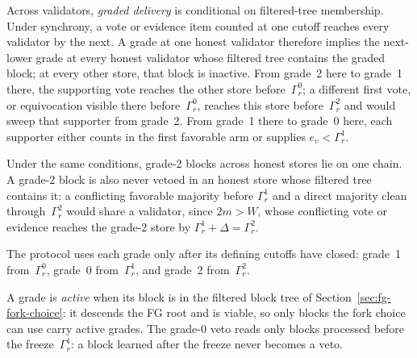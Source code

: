\documentclass{article}
\theoremstyle{plain}
\theoremstyle{definition}
\theoremstyle{remark}
\begin{document}
Across validators, \emph{graded delivery} is conditional on
filtered-tree membership.
Under synchrony, a vote or evidence item counted at one cutoff reaches
every validator by the next.  A grade at one honest validator therefore
implies the next-lower grade at every honest validator whose filtered tree
contains the graded block; at every other store, that block is inactive.
From grade~2 here to grade~1 there, the supporting vote reaches the other
store before~$\Gamma_r^0$; a different first vote, or equivocation visible
there before~$\Gamma_r^0$, reaches this store before~$\Gamma_r^2$ and would
sweep that supporter from grade~2.  From grade~1 there to grade~0 here,
each supporter either counts in the first favorable arm or supplies
$e_v<\Gamma_r^1$.

Under the same conditions, grade-2 blocks across honest stores lie on one
chain.  A grade-2 block is also never vetoed in an honest store whose
filtered tree contains it: a conflicting favorable majority before
$\Gamma_r^1$ and a direct majority clean through~$\Gamma_r^2$ would share
a validator, since $2m>W$, whose conflicting vote or evidence reaches the
grade-2 store by $\Gamma_r^1+\Delta=\Gamma_r^2$.

The protocol uses each grade only after its defining cutoffs have closed:
grade~1 from~$\Gamma_r^0$, grade~0 from~$\Gamma_r^1$, and grade~2
from~$\Gamma_r^2$.

A grade is \emph{active} when its block is in the filtered block tree of
Section~\ref{sec:fg-fork-choice}: it descends the FG root and is
viable, so only blocks the fork choice can use carry active grades.  The
grade-0 veto reads only blocks processed before the
freeze~$\Gamma_r^1$: a block learned after the freeze never becomes a
veto.
\end{document}
